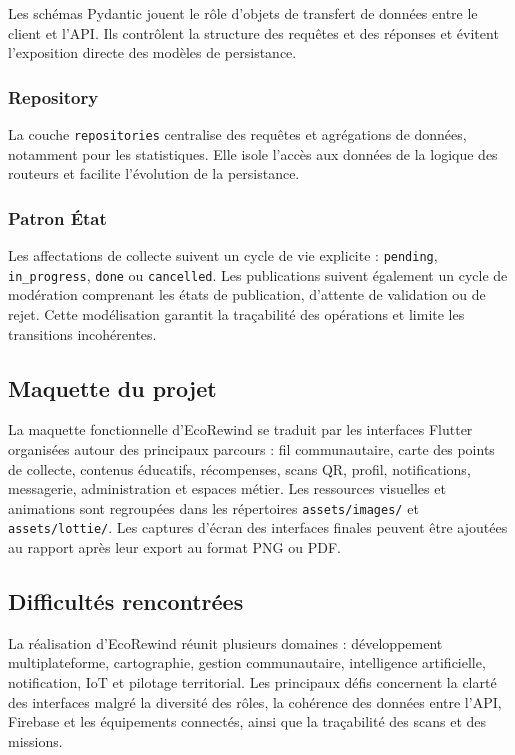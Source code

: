 Les schémas Pydantic jouent le rôle d'objets de transfert de données entre le client et l'API. Ils contrôlent la structure des requêtes et des réponses et évitent l'exposition directe des modèles de persistance.

\subsubsection{Repository}

La couche \texttt{repositories} centralise des requêtes et agrégations de données, notamment pour les statistiques. Elle isole l'accès aux données de la logique des routeurs et facilite l'évolution de la persistance.

\subsubsection{Patron État}

Les affectations de collecte suivent un cycle de vie explicite : \texttt{pending}, \texttt{in\_progress}, \texttt{done} ou \texttt{cancelled}. Les publications suivent également un cycle de modération comprenant les états de publication, d'attente de validation ou de rejet. Cette modélisation garantit la traçabilité des opérations et limite les transitions incohérentes.

\subsection{Maquette du projet}
\label{subsec:maquette_projet}

La maquette fonctionnelle d'EcoRewind se traduit par les interfaces Flutter organisées autour des principaux parcours : fil communautaire, carte des points de collecte, contenus éducatifs, récompenses, scans QR, profil, notifications, messagerie, administration et espaces métier. Les ressources visuelles et animations sont regroupées dans les répertoires \texttt{assets/images/} et \texttt{assets/lottie/}. Les captures d'écran des interfaces finales peuvent être ajoutées au rapport après leur export au format PNG ou PDF.

\subsection{Difficultés rencontrées}
\label{subsec:difficultes_rencontrees}

La réalisation d'EcoRewind réunit plusieurs domaines : développement multiplateforme, cartographie, gestion communautaire, intelligence artificielle, notification, IoT et pilotage territorial. Les principaux défis concernent la clarté des interfaces malgré la diversité des rôles, la cohérence des données entre l'API, Firebase et les équipements connectés, ainsi que la traçabilité des scans et des missions.

